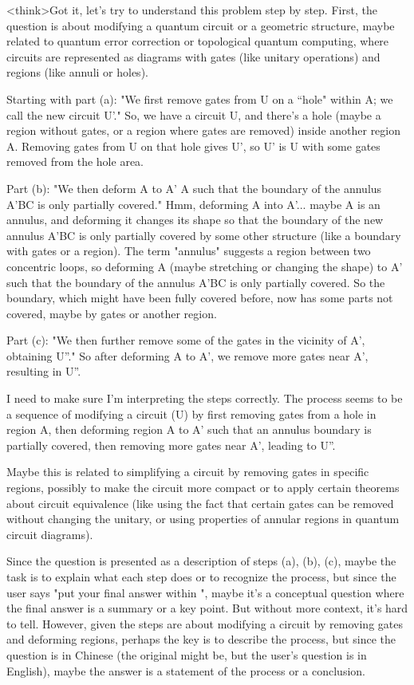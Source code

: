 <think>Got it, let's try to understand this problem step by step. First, the question is about modifying a quantum circuit or a geometric structure, maybe related to quantum error correction or topological quantum computing, where circuits are represented as diagrams with gates (like unitary operations) and regions (like annuli or holes). 

Starting with part (a): "We first remove gates from U on a ``hole" within A; we call the new circuit U'." So, we have a circuit U, and there's a hole (maybe a region without gates, or a region where gates are removed) inside another region A. Removing gates from U on that hole gives U', so U' is U with some gates removed from the hole area. 

Part (b): "We then deform A to A' A such that the boundary of the annulus A'BC is only partially covered." Hmm, deforming A into A'... maybe A is an annulus, and deforming it changes its shape so that the boundary of the new annulus A'BC is only partially covered by some other structure (like a boundary with gates or a region). The term "annulus" suggests a region between two concentric loops, so deforming A (maybe stretching or changing the shape) to A' such that the boundary of the annulus A'BC is only partially covered. So the boundary, which might have been fully covered before, now has some parts not covered, maybe by gates or another region.

Part (c): "We then further remove some of the gates in the vicinity of A', obtaining U''." So after deforming A to A', we remove more gates near A', resulting in U''. 

I need to make sure I'm interpreting the steps correctly. The process seems to be a sequence of modifying a circuit (U) by first removing gates from a hole in region A, then deforming region A to A' such that an annulus boundary is partially covered, then removing more gates near A', leading to U''. 

Maybe this is related to simplifying a circuit by removing gates in specific regions, possibly to make the circuit more compact or to apply certain theorems about circuit equivalence (like using the fact that certain gates can be removed without changing the unitary, or using properties of annular regions in quantum circuit diagrams). 

Since the question is presented as a description of steps (a), (b), (c), maybe the task is to explain what each step does or to recognize the process, but since the user says "put your final answer within \boxed{}", maybe it's a conceptual question where the final answer is a summary or a key point. But without more context, it's hard to tell. However, given the steps are about modifying a circuit by removing gates and deforming regions, perhaps the key is to describe the process, but since the question is in Chinese (the original might be, but the user's question is in English), maybe the answer is a statement of the process or a conclusion. 

